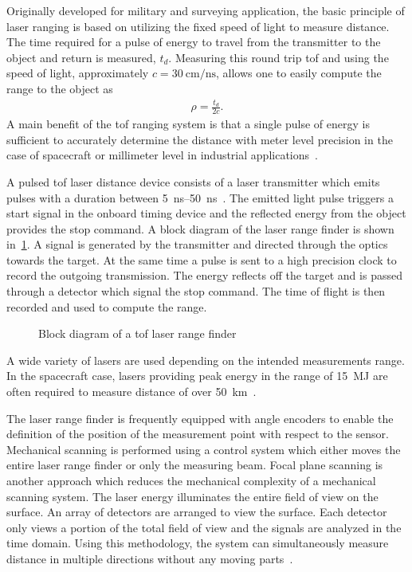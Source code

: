 Originally developed for military and surveying application, the basic principle of laser ranging is based on utilizing the fixed speed of light to measure distance.
The time required for a pulse of energy to travel from the transmitter to the object and return is measured, \( t_d \). 
Measuring this round trip \gls{tof} and using the speed of light, approximately \( c = \SI{30}{\centi\meter\per\nano\second}\), allows one to easily compute the range to the object as
\begin{align}
    \rho = \frac{t_d}{2 c}. 
\end{align}
A main benefit of the \gls{tof} ranging system is that a single pulse of energy is sufficient to accurately determine the distance with meter level precision in the case of spacecraft or millimeter level in industrial applications~\cite{zuber1997,cole1998,amann2001}.

A pulsed \gls{tof} laser distance device consists of a laser transmitter which emits pulses with a duration between \SIrange{5}{50}{\nano\second}~\cite{amann2001}.
The emitted light pulse triggers a start signal in the onboard timing device and the reflected energy from the object provides the stop command.
A block diagram of the laser range finder is shown in~\cref{fig:lidar_block_diagram}.
A signal is generated by the transmitter and directed through the optics towards the target. 
At the same time a pulse is sent to a high precision clock to record the outgoing transmission. 
The energy reflects off the target and is passed through a detector which signal the stop command. 
The time of flight is then recorded and used to compute the range.
\begin{figure}[htbp]
    \centering
    
    \caption{ Block diagram of a \gls{tof} laser range finder\label{fig:lidar_block_diagram}}
\end{figure}
A wide variety of lasers are used depending on the intended measurements range.
In the spacecraft case, lasers providing peak energy in the range of \SI{15}{\mega\joule} are often required to measure distance of over \SI{50}{\kilo\meter}~\cite{berry2013}.

The laser range finder is frequently equipped with angle encoders to enable the definition of the position of the measurement point with respect to the sensor. 
Mechanical scanning is performed using a control system which  either moves the entire laser range finder or only the measuring beam.
Focal plane scanning is another approach which reduces the mechanical complexity of a mechanical scanning system.
The laser energy illuminates the entire field of view on the surface.
An array of detectors are arranged to view the surface.
Each detector only views a portion of the total field of view and the signals are analyzed in the time domain.
Using this methodology, the system can simultaneously measure distance in multiple directions without any moving parts~\cite{amann2001}.

